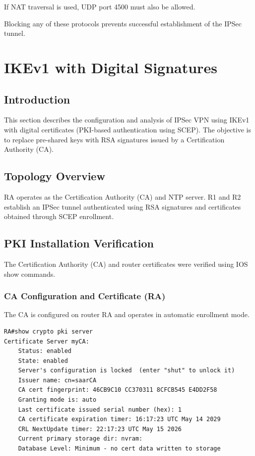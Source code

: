 \documentclass[12pt]{article}
\begin{document}
If NAT traversal is used, UDP port 4500 must also be allowed.

Blocking any of these protocols prevents successful establishment of the IPSec tunnel.


\newpage

\section{IKEv1 with Digital Signatures}

\subsection{Introduction}

This section describes the configuration and analysis of IPSec VPN using IKEv1 with digital certificates (PKI-based authentication using SCEP). 
The objective is to replace pre-shared keys with RSA signatures issued by a Certification Authority (CA).

\subsection{Topology Overview}

RA operates as the Certification Authority (CA) and NTP server. 
R1 and R2 establish an IPSec tunnel authenticated using RSA signatures and certificates obtained through SCEP enrollment.

\subsection{PKI Installation Verification}

The Certification Authority (CA) and router certificates were verified using IOS show commands.

\subsubsection{CA Configuration and Certificate (RA)}

The CA is configured on router RA and operates in automatic enrollment mode.

\begin{verbatim}
RA#show crypto pki server
Certificate Server myCA:
    Status: enabled
    State: enabled
    Server's configuration is locked  (enter "shut" to unlock it)
    Issuer name: cn=saarCA
    CA cert fingerprint: 46CB9C10 CC370311 8CFCB545 E4DD2F58 
    Granting mode is: auto
    Last certificate issued serial number (hex): 1
    CA certificate expiration timer: 16:17:23 UTC May 14 2029
    CRL NextUpdate timer: 22:17:23 UTC May 15 2026
    Current primary storage dir: nvram:
    Database Level: Minimum - no cert data written to storage
\end{verbatim}
\end{document}
